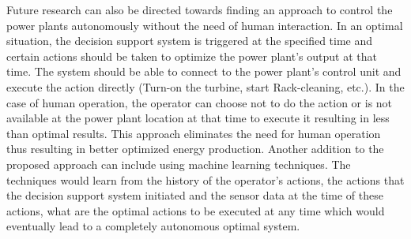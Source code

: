 Future research can also be directed towards finding an approach to control the power plants autonomously without the need of human interaction. In an optimal situation, the decision support system is triggered at the specified time and certain actions should be taken to optimize the power plant's output at that time. The system should be able to connect to the power plant's control unit and execute the action directly (Turn-on the turbine, start Rack-cleaning, etc.). In the case of human operation, the operator can choose not to do the action or is not available at the power plant location at that time to execute it resulting in less than optimal results. This approach eliminates the need for human operation thus resulting in better optimized energy production. Another addition to the proposed approach can include using machine learning techniques. The techniques would learn from the history of the operator's actions, the actions that the decision support system initiated and the sensor data at the time of these actions, what are the optimal actions to be executed at any time which would eventually lead to a completely autonomous optimal system.






